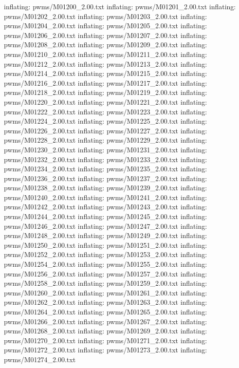 \documentclass[letterpaper,10pt,english]{sphinxmanual}
\begin{document}
{\begin{sphinxVerbatim}[commandchars=\\\{\}]
  inflating: pwms/M01200\_2.00.txt
  inflating: pwms/M01201\_2.00.txt
  inflating: pwms/M01202\_2.00.txt
  inflating: pwms/M01203\_2.00.txt
  inflating: pwms/M01204\_2.00.txt
  inflating: pwms/M01205\_2.00.txt
  inflating: pwms/M01206\_2.00.txt
  inflating: pwms/M01207\_2.00.txt
  inflating: pwms/M01208\_2.00.txt
  inflating: pwms/M01209\_2.00.txt
  inflating: pwms/M01210\_2.00.txt
  inflating: pwms/M01211\_2.00.txt
  inflating: pwms/M01212\_2.00.txt
  inflating: pwms/M01213\_2.00.txt
  inflating: pwms/M01214\_2.00.txt
  inflating: pwms/M01215\_2.00.txt
  inflating: pwms/M01216\_2.00.txt
  inflating: pwms/M01217\_2.00.txt
  inflating: pwms/M01218\_2.00.txt
  inflating: pwms/M01219\_2.00.txt
  inflating: pwms/M01220\_2.00.txt
  inflating: pwms/M01221\_2.00.txt
  inflating: pwms/M01222\_2.00.txt
  inflating: pwms/M01223\_2.00.txt
  inflating: pwms/M01224\_2.00.txt
  inflating: pwms/M01225\_2.00.txt
  inflating: pwms/M01226\_2.00.txt
  inflating: pwms/M01227\_2.00.txt
  inflating: pwms/M01228\_2.00.txt
  inflating: pwms/M01229\_2.00.txt
  inflating: pwms/M01230\_2.00.txt
  inflating: pwms/M01231\_2.00.txt
  inflating: pwms/M01232\_2.00.txt
  inflating: pwms/M01233\_2.00.txt
  inflating: pwms/M01234\_2.00.txt
  inflating: pwms/M01235\_2.00.txt
  inflating: pwms/M01236\_2.00.txt
  inflating: pwms/M01237\_2.00.txt
  inflating: pwms/M01238\_2.00.txt
  inflating: pwms/M01239\_2.00.txt
  inflating: pwms/M01240\_2.00.txt
  inflating: pwms/M01241\_2.00.txt
  inflating: pwms/M01242\_2.00.txt
  inflating: pwms/M01243\_2.00.txt
  inflating: pwms/M01244\_2.00.txt
  inflating: pwms/M01245\_2.00.txt
  inflating: pwms/M01246\_2.00.txt
  inflating: pwms/M01247\_2.00.txt
  inflating: pwms/M01248\_2.00.txt
  inflating: pwms/M01249\_2.00.txt
  inflating: pwms/M01250\_2.00.txt
  inflating: pwms/M01251\_2.00.txt
  inflating: pwms/M01252\_2.00.txt
  inflating: pwms/M01253\_2.00.txt
  inflating: pwms/M01254\_2.00.txt
  inflating: pwms/M01255\_2.00.txt
  inflating: pwms/M01256\_2.00.txt
  inflating: pwms/M01257\_2.00.txt
  inflating: pwms/M01258\_2.00.txt
  inflating: pwms/M01259\_2.00.txt
  inflating: pwms/M01260\_2.00.txt
  inflating: pwms/M01261\_2.00.txt
  inflating: pwms/M01262\_2.00.txt
  inflating: pwms/M01263\_2.00.txt
  inflating: pwms/M01264\_2.00.txt
  inflating: pwms/M01265\_2.00.txt
  inflating: pwms/M01266\_2.00.txt
  inflating: pwms/M01267\_2.00.txt
  inflating: pwms/M01268\_2.00.txt
  inflating: pwms/M01269\_2.00.txt
  inflating: pwms/M01270\_2.00.txt
  inflating: pwms/M01271\_2.00.txt
  inflating: pwms/M01272\_2.00.txt
  inflating: pwms/M01273\_2.00.txt
  inflating: pwms/M01274\_2.00.txt

\end{sphinxVerbatim}}
\end{document}
